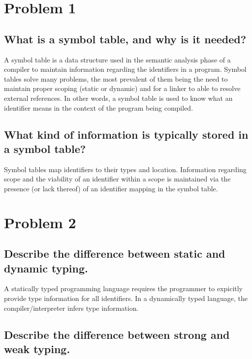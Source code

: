 \documentclass[twoside]{article}
\begin{document}
\begin{multicols}{2} %

    \section{Problem 1}
    \subsection{What is a symbol table, and why is it needed?}

    A symbol table is a data structure used in the semantic analysis phase of a compiler to maintain information regarding the identifiers in a program.
    Symbol tables solve many problems, the most prevalent of them being the need to maintain proper scoping (static or dynamic) and for a linker to able to resolve external references.
    In other words, a symbol table is used to know what an identifier means in the context of the program being compiled.

    \subsection{What kind of information is typically stored in a symbol table?}

    Symbol tables map identifiers to their types and location.
    Information regarding scope and the viability of an identifier within a scope is maintained via the presence (or lack thereof) of an identifier mapping in the symbol table.


    \section{Problem 2}
    \subsection{Describe the difference between static and dynamic typing.}

    A statically typed programming language requires the programmer to expicitly provide type information for all identifiers.
    In a dynamically typed language, the compiler/interpreter infers type information.

    \subsection{Describe the difference between strong and weak typing.}


\end{multicols}
\end{document}
